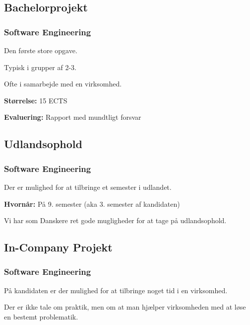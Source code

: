 {\subsection{Bachelorprojekt}
\begin{frame}[fragile]
  \frametitle{Software Engineering }
  \pause
  \vspace{3mm}
  Den første store opgave.
  
  \vspace{5mm}
  Typisk i grupper af 2-3.
  
  \vspace{5mm}
  Ofte i samarbejde med en virksomhed.
  
  \pause
  \vspace{5mm}
  \textbf{Størrelse:} 15 ECTS
  
  \pause
  \vspace{5mm}
  \textbf{Evaluering:} Rapport med mundtligt forsvar
\end{frame}

\subsection{Udlandsophold}
\begin{frame}[fragile]
  \frametitle{Software Engineering }
  \pause
  \vspace{3mm}
  Der er mulighed for at tilbringe et semester i udlandet.
  
  \vspace{5mm}
  \textbf{Hvornår:} På 9. semester \pause (aka 3. semester af kandidaten)
  
  \vspace{5mm}
  Vi har som Danskere ret gode mugligheder for at tage på udlandsophold.
\end{frame}

\subsection{In-Company Projekt}
\begin{frame}[fragile]
  \frametitle{Software Engineering }
  \pause
  \vspace{3mm}
  På kandidaten er der mulighed for at tilbringe noget tid i en virksomhed.
  
  \vspace{5mm}
  Der er ikke tale om praktik, men om at man hjælper virksomheden med at løse en bestemt problematik.
  

\end{frame}}
